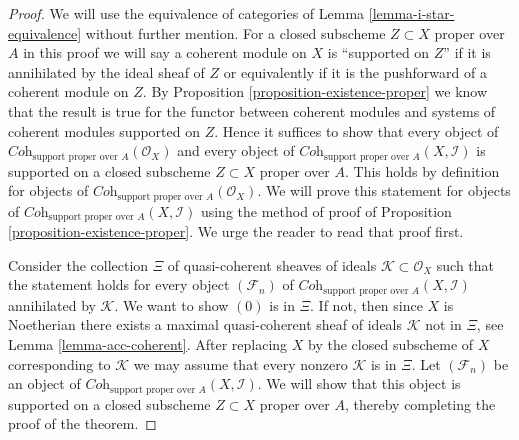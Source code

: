 \documentclass[10pt,a4paper]{amsart}
\theoremstyle{plain}
\theoremstyle{definition}
\theoremstyle{remark}
\numberwithin{equation}{subsection}
\begin{document}
\begin{proof}
We will use the equivalence of categories of
Lemma \ref{lemma-i-star-equivalence}
without further mention.
For a closed subscheme $Z \subset X$ proper over $A$
in this proof we will say a coherent module on $X$ is
``supported on $Z$'' if it is annihilated by the ideal
sheaf of $Z$ or equivalently if it is the pushforward
of a coherent module on $Z$.
By Proposition \ref{proposition-existence-proper} we know
that the result is true for
the functor between coherent modules and systems of coherent
modules supported on $Z$. Hence it suffices to show that
every object of
$\textit{Coh}_{\text{support proper over }A}(\mathcal{O}_X)$
and every object of
$\textit{Coh}_{\text{support proper over }A}(X, \mathcal{I})$ is
supported on a closed subscheme $Z \subset X$ proper over $A$.
This holds by definition for objects of
$\textit{Coh}_{\text{support proper over }A}(\mathcal{O}_X)$.
We will prove this statement for objects of
$\textit{Coh}_{\text{support proper over }A}(X, \mathcal{I})$
using the method of proof of Proposition \ref{proposition-existence-proper}.
We urge the reader to read that proof first.

\medskip\noindent
Consider the collection $\Xi$ of quasi-coherent sheaves of ideals
$\mathcal{K} \subset \mathcal{O}_X$ such that the statement holds
for every object $(\mathcal{F}_n)$ of
$\textit{Coh}_{\text{support proper over }A}(X, \mathcal{I})$
annihilated by $\mathcal{K}$. We want to show $(0)$ is in $\Xi$.
If not, then since $X$ is Noetherian there exists a maximal
quasi-coherent sheaf of ideals $\mathcal{K}$ not in $\Xi$, see
Lemma \ref{lemma-acc-coherent}.
After replacing $X$ by the closed subscheme of $X$
corresponding to $\mathcal{K}$ we may assume that every nonzero
$\mathcal{K}$ is in $\Xi$. Let $(\mathcal{F}_n)$ be an object of
$\textit{Coh}_{\text{support proper over }A}(X, \mathcal{I})$.
We will show that this object is supported on a closed subscheme
$Z \subset X$ proper over $A$, thereby completing the
proof of the theorem.


\end{proof}
\end{document}

